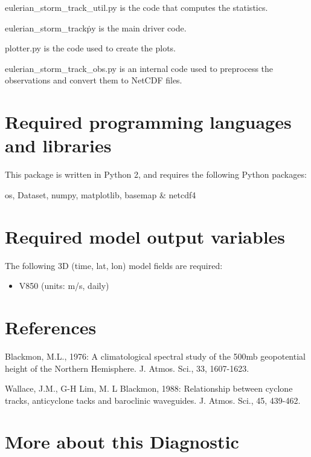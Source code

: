 \documentclass{article}
\begin{document}
\hfill

eulerian\_storm\_track\_util.py is the code that computes the statistics. 

eulerian\_storm\_track\.py is the main driver code. 

plotter.py is the code used to create the plots. 

eulerian\_storm\_track\_obs.py is an internal code used to preprocess the observations and convert them to NetCDF files. 

\section*{Required programming languages and libraries}

\noindent
This package is written in Python 2, and requires the following Python packages: 

\indent
  os, Dataset, numpy, matplotlib, basemap \& netcdf4


\section*{Required model output variables}
\noindent
The following 3D (time, lat, lon) model fields are required:

\begin{itemize}
  \item V850 (units: m/s, daily)
\end{itemize}


\section*{References}
\noindent
Blackmon, M.L., 1976: A climatological spectral study of the 500mb geopotential height of the Northern Hemisphere. J. Atmos. Sci., 33, 1607-1623.

\noindent
Wallace, J.M., G-H Lim, M. L Blackmon, 1988: Relationship between cyclone tracks, anticyclone tacks and baroclinic waveguides. J. Atmos. Sci., 45, 439-462.

\section*{More about this Diagnostic}
\end{document}

